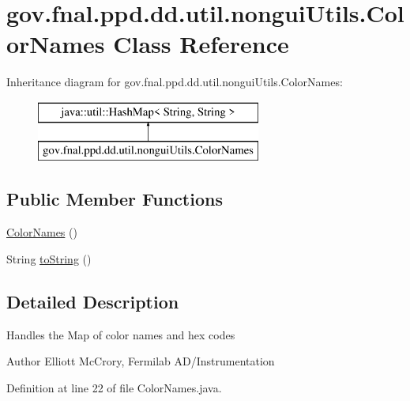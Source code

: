 \hypertarget{classgov_1_1fnal_1_1ppd_1_1dd_1_1util_1_1nonguiUtils_1_1ColorNames}{\section{gov.\-fnal.\-ppd.\-dd.\-util.\-nongui\-Utils.\-Color\-Names Class Reference}
\label{classgov_1_1fnal_1_1ppd_1_1dd_1_1util_1_1nonguiUtils_1_1ColorNames}
}
Inheritance diagram for gov.\-fnal.\-ppd.\-dd.\-util.\-nongui\-Utils.\-Color\-Names\-:\begin{figure}[H]
\begin{center}
\leavevmode
\includegraphics[height=2.000000cm]{classgov_1_1fnal_1_1ppd_1_1dd_1_1util_1_1nonguiUtils_1_1ColorNames}
\end{center}
\end{figure}
\subsection*{Public Member Functions}
\begin{DoxyCompactItemize}
\item 
\hyperlink{classgov_1_1fnal_1_1ppd_1_1dd_1_1util_1_1nonguiUtils_1_1ColorNames_a33e7e1d6596187e15f63db7c3f07b391}{Color\-Names} ()
\item 
String \hyperlink{classgov_1_1fnal_1_1ppd_1_1dd_1_1util_1_1nonguiUtils_1_1ColorNames_ab2ef68816f5dfde5d491fd4dd35f4f5f}{to\-String} ()
\end{DoxyCompactItemize}


\subsection{Detailed Description}
Handles the Map of color names and hex codes

\begin{DoxyAuthor}{Author}
Elliott Mc\-Crory, Fermilab A\-D/\-Instrumentation 
\end{DoxyAuthor}


Definition at line 22 of file Color\-Names.\-java.



